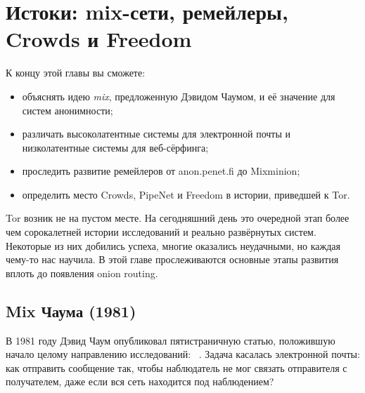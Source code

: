 \chapter{Истоки: mix-сети, ремейлеры, Crowds и Freedom}\label{cap:02-radici}

\begin{obiettivi}
К концу этой главы вы сможете:
\begin{itemize}[nosep]
  \item объяснять идею \emph{mix}, предложенную Дэвидом Чаумом, и её значение для систем анонимности;
  \item различать высоколатентные системы для электронной почты и низколатентные системы для веб-сёрфинга;
  \item проследить развитие ремейлеров от anon.penet.fi до Mixminion;
  \item определить место Crowds, PipeNet и Freedom в истории, приведшей к Tor.
\end{itemize}
\end{obiettivi}

Tor возник не на пустом месте. На сегодняшний день это очередной этап более чем сорокалетней истории исследований и реально развёрнутых систем. Некоторые из них добились успеха, многие оказались неудачными, но каждая чему-то нас научила. В этой главе прослеживаются основные этапы развития вплоть до появления onion routing.

\section{Mix Чаума (1981)}\label{sec:radici-chaum}

В 1981 году Дэвид Чаум опубликовал пятистраничную статью, положившую начало целому направлению исследований: ~\cite{chaum1981untraceable}. Задача касалась электронной почты: как отправить сообщение так, чтобы наблюдатель не мог связать отправителя с получателем, даже если вся сеть находится под наблюдением?

